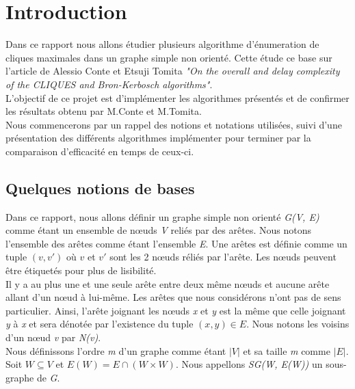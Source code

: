 \documentclass[a4paper, 12pt]{article}
\begin{document}
\tableofcontents

\newpage

\section{Introduction}

Dans ce rapport nous allons étudier plusieurs algorithme d'énumeration de cliques maximales dans un graphe simple non orienté. Cette étude ce base sur l'article de Alessio Conte et Etsuji Tomita  \textit{"On the overall and delay complexity of the CLIQUES and Bron-Kerbosch algorithms"}. \\
L'objectif de ce projet est d'implémenter les algorithmes présentés et de confirmer les résultats obtenu par M.Conte et M.Tomita. \\

Nous commencerons par un rappel des notions et notations utilisées, suivi d'une présentation des différents algorithmes implémenter pour terminer par la comparaison d'efficacité en temps de ceux-ci.

\subsection{Quelques notions de bases} 

Dans ce rapport, nous allons définir un graphe simple non orienté \emph{G(V, E)} comme étant un ensemble de nœuds \emph{V} reliés par des arêtes. Nous notons l'ensemble des arêtes comme étant l'ensemble \emph{E}. Une arêtes est définie comme un tuple $ (v, v') $ où $ v $ et $ v' $ sont les 2 nœuds réliés par l'arête. Les nœuds peuvent être étiquetés pour plus de lisibilité. \\

Il y a au plus une et une seule arête entre deux même nœuds et aucune arête allant d'un nœud à lui-même. Les arêtes que nous considérons n'ont pas de sens particulier. Ainsi, l'arête joignant les nœuds \emph{x} et \emph{y} est la même que celle joignant \emph{y} à \emph{x} et sera dénotée par l'existence du tuple $(x, y) \in E$.
Nous notons les voisins d'un nœud \emph{v} par \emph{N(v)}.\\ 

Nous définissons l'ordre \emph{m} d'un graphe comme étant $ |V| $ et sa taille \emph{m} comme $ |E| $. \\

Soit $ W \subseteq V $ et $ E(W) = E \cap (W \times W) $. Nous appellons \emph{SG(W, E(W))} un sous-graphe de \emph{G}.
\end{document}
